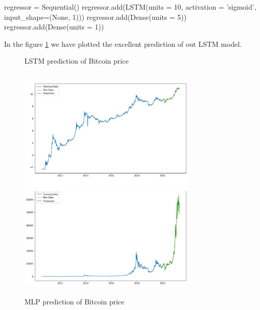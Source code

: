 \documentclass[11pt]{article}
\begin{document}
\begin{python}
regressor = Sequential()
regressor.add(LSTM(units = 10, activation = 'sigmoid', input_shape=(None, 1)))
regressor.add(Dense(units = 5))
regressor.add(Dense(units = 1))
\end{python}

In the figure \ref{fig:3} we have plotted the excellent prediction of out LSTM model.

\begin{figure}
    \centering
    
    \caption{LSTM prediction of Bitcoin price}
    \label{fig:3}
\end{figure}

\begin{figure}
\includegraphics[width=8.5cm, height=11.5cm]{mlp.png}
    \caption{MLP prediction of Bitcoin price}
    \label{fig:4}
\end{figure} 
\end{document}
